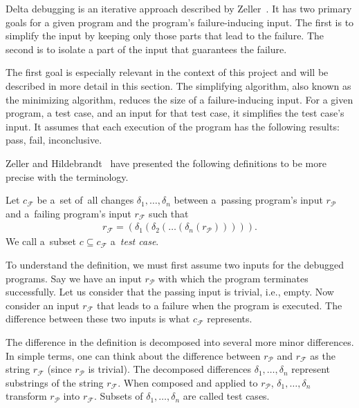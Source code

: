 Delta debugging is an iterative approach described by Zeller~\citep{Zeller99}. 
It has two primary goals for a given program and the program's 
failure-inducing input. 
The first is to simplify the input by keeping only those parts that lead to 
the failure. 
The second is to isolate a part of the input that guarantees the failure. 

The first goal is especially relevant in the context of this project and 
will be described in more detail in this section.
The simplifying algorithm, also known as the minimizing algorithm, reduces 
the size of a failure-inducing input. 
For a given program, a test case, and an input for that test case, it 
simplifies the test case's input. 
It assumes that each execution of the program has the following results: 
pass, fail, inconclusive. 

Zeller and Hildebrandt~\citep*{Zeller02} have presented the following 
definitions to be more precise with the terminology.

\begin{defn}\label{def02:1}
  Let $c_\mathcal{F}$ be a~set of~all changes $\delta_1,\dots,\delta_n$ 
  between a~passing program's input $r_\mathcal{P}$ and a~failing 
  program's input $r_\mathcal{F}$ such that 
  \begin{align}
	r_\mathcal{F} = (\delta_1(\delta_2(\dots(\delta_n(r_\mathcal{P}))))). \nonumber 
  \end{align}
  We call a~subset $c \subseteq c_\mathcal{F}$ a~\emph{test case}.
\end{defn}

To understand the definition, we must first assume two inputs for 
the debugged programs. 
Say we have an input $r_\mathcal{P}$ with which the program terminates 
successfully. 
Let us consider that the passing input is trivial, i.e., empty. 
Now consider an input $r_\mathcal{F}$ that leads to a failure when 
the program is executed. 
The difference between these two inputs is what $c_\mathcal{F}$ represents. 

The difference in the definition is decomposed into several more minor 
differences. 
In simple terms, one can think about the difference between $r_\mathcal{P}$ 
and $r_\mathcal{F}$ as the string $r_\mathcal{F}$ (since $r_\mathcal{P}$ is 
trivial). 
The decomposed differences $\delta_1, \dots, \delta_n$ represent substrings 
of the string $r_\mathcal{F}$. When composed and applied to $r_\mathcal{P}$, 
$\delta_1, \ldots, \delta_n$ transform $r_\mathcal{P}$ into $r_\mathcal{F}$. 
Subsets of ${\delta_1, \dots, \delta_n}$ are called test cases.

